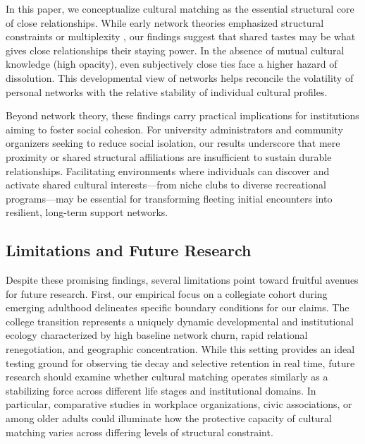\documentclass[
  letterpaper,
  DIV=11,
  numbers=noendperiod]{scrartcl}
\begin{document}
In this paper, we conceptualize cultural matching as the essential structural core of close relationships. While early network theories emphasized structural constraints or multiplexity \citep{burt2000}, our findings suggest that shared tastes may be what gives close relationships their staying power. In the absence of mutual cultural knowledge (high opacity), even subjectively close ties face a higher hazard of dissolution. This developmental view of networks helps reconcile the volatility of personal networks with the relative stability of individual cultural profiles.

Beyond network theory, these findings carry practical implications for institutions aiming to foster social cohesion. For university administrators and community organizers seeking to reduce social isolation, our results underscore that mere proximity or shared structural affiliations are insufficient to sustain durable relationships. Facilitating environments where individuals can discover and activate shared cultural interests---from niche clubs to diverse recreational programs---may be essential for transforming fleeting initial encounters into resilient, long-term support networks.

\subsection{Limitations and Future Research}
Despite these promising findings, several limitations point toward fruitful avenues for future research. First, our empirical focus on a collegiate cohort during emerging adulthood delineates specific boundary conditions for our claims. The college transition represents a uniquely dynamic developmental and institutional ecology characterized by high baseline network churn, rapid relational renegotiation, and geographic concentration. While this setting provides an ideal testing ground for observing tie decay and selective retention in real time, future research should examine whether cultural matching operates similarly as a stabilizing force across different life stages and institutional domains. In particular, comparative studies in workplace organizations, civic associations, or among older adults \citep{cornwell2008social-257} could illuminate how the protective capacity of cultural matching varies across differing levels of structural constraint.
\end{document}
